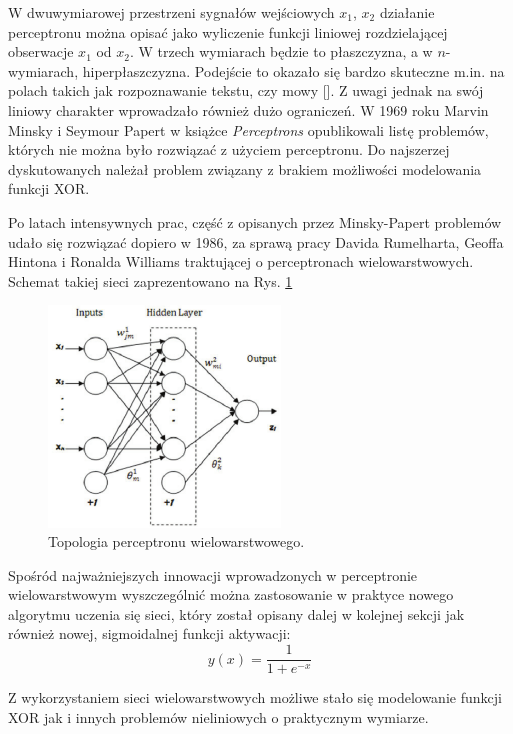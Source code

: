W dwuwymiarowej przestrzeni sygnałów wejściowych {$x_1$, $x_2$}  działanie perceptronu można opisać jako wyliczenie funkcji liniowej rozdzielającej obserwacje $x_1$ od $x_2$. W trzech wymiarach będzie to płaszczyzna, a w $n$-wymiarach, hiperpłaszczyzna. Podejście to okazało się bardzo skuteczne m.in. na polach takich jak rozpoznawanie tekstu, czy mowy []. Z uwagi jednak na swój liniowy charakter wprowadzało również dużo ograniczeń. W 1969 roku Marvin Minsky i Seymour Papert w książce \textit{Perceptrons} opublikowali listę problemów, których nie można było rozwiązać z użyciem perceptronu. Do najszerzej dyskutowanych należał problem związany z brakiem możliwości modelowania funkcji XOR.

Po latach intensywnych prac, część z opisanych przez Minsky-Papert problemów udało się rozwiązać dopiero w 1986, za sprawą pracy Davida Rumelharta, Geoffa Hintona i Ronalda Williams traktującej o perceptronach wielowarstwowych. Schemat takiej sieci zaprezentowano na Rys. \ref{MLperceptron}
\begin{figure}[h!]
	\centering
	\includegraphics[width=0.55\textwidth]{figures/MLperceptron.png}
	\caption{Topologia perceptronu wielowarstwowego.}
	\label{MLperceptron}
\end{figure}

Spośród najważniejszych innowacji wprowadzonych w perceptronie wielowarstwowym wyszczególnić można zastosowanie w praktyce nowego algorytmu uczenia się sieci, który został opisany dalej w kolejnej sekcji jak również nowej, sigmoidalnej funkcji aktywacji:
\begin{equation}
\label{eqSigActFunc}
y(x) = \frac{1}{1 + e^{-x}}
\end{equation}

Z wykorzystaniem sieci wielowarstwowych możliwe stało się modelowanie funkcji XOR jak i innych problemów nieliniowych o praktycznym wymiarze. 

